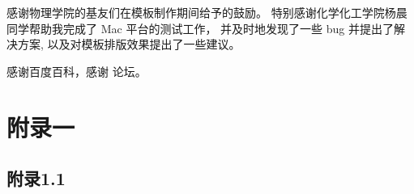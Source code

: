 \documentclass[pageheader,chapter,shorttitle,mathtxf]{NJUbachelor}
\begin{document}








%



\newpage
{}

\nocite{*}

%


\ack

感谢物理学院的基友们在模板制作期间给予的鼓励。
特别感谢化学化工学院杨晨同学帮助我完成了 Mac 平台的测试工作，
并及时地发现了一些 bug 并提出了解决方案,
以及对模板排版效果提出了一些建议。

感谢百度百科，感谢 \CTeX{} 论坛。

\appendix

\chapter{附录一}

\section{附录1.1}
\end{document}
